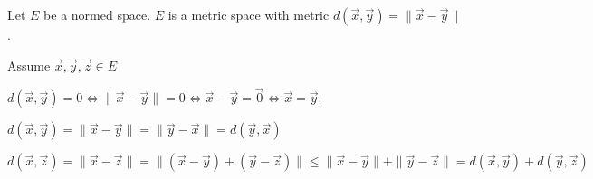 \documentclass[letterpaper,12pt,fleqn]{article}
\newcommand{\norm}[1]{\|#1\|}
\newcommand{\vx}{\vec{x}}
\newcommand{\vy}{\vec{y}}
\newcommand{\vz}{\vec{z}}
\newcommand{\vo}{\vec{0}}
\begin{document}
\begin{theorem}
  Let $E$ be a normed space. $E$ is a metric space with metric
  $d(\vx,\vy)=\norm{\vx-\vy}$.
\end{theorem}

\begin{theproof}
  Assume $\vx,\vy,\vz\in E$

  $d(\vx,\vy)=0\iff\norm{\vx-\vy}=0\iff\vx-\vy=\vo\iff\vx=\vy$.

  $d(\vx,\vy)=\norm{\vx-\vy}=\norm{\vy-\vx}=d(\vy,\vx)$

  $d(\vx,\vz)=\norm{\vx-\vz}=\norm{(\vx-\vy)+(\vy-\vz)}\le
  \norm{\vx-\vy}+\norm{\vy-\vz}=d(\vx,\vy)+d(\vy,\vz)$
\end{theproof}
\end{document}
